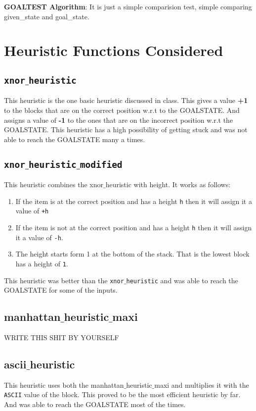\documentclass[a4paper,10pt,reqno,oneside]{amsart}
\begin{document}
\textbf{GOALTEST Algorithm}: It is just a simple comparision test, simple 
comparing given\_state and goal\_state.

\section{Heuristic Functions Considered}
\subsection*{\texttt{xnor$\_$heuristic}}
This heuristic is the one basic heuristic discussed in class. This gives a value \textbf{+1}
to the blocks that are on the correct position w.r.t to the GOALSTATE. And assigns a value of 
\textbf{-1} to the ones that are on the incorrect position w.r.t the GOALSTATE.
\newline
This heuristic has a high possibility of getting stuck and was not able to reach the GOALSTATE many a times.

\subsection*{\texttt{xnor$\_$heuristic$\_$modified}}
This heuristic combines the xnor$\_$heuristic with height.
It works as follows:
\begin{enumerate}
    \item If the item is at the correct position and has a height \texttt{h} then it will assign it a value of \texttt{+h}
    \item If the item is not at the correct position and has a height \texttt{h} then it will assign it a value of \texttt{-h}.
    \item The height starts form 1 at the bottom of the stack. That is the lowest block has a height of \texttt{1}.
\end{enumerate}
\newline
This heuristic was better than the \texttt{xnor$\_$heuristic} and was able to reach the GOALSTATE for some of the inputs.

\subsection*{manhattan$\_$heuristic$\_$maxi}
\begin{Huge}
    WRITE THIS SHIT BY YOURSELF
\end{Huge}

\subsection*{ascii$\_$heuristic}
This heuristic uses both the manhattan$\_$heuristic$\_$maxi and multiplies it with the \texttt{ASCII} value of the block. This proved to be the most efficient heuristic
 by far. And was able to reach the GOALSTATE most of the times.
\end{document}
